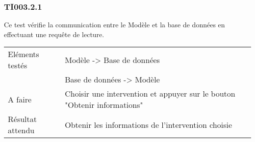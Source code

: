 \subsubsection{TI003.2.1}
  		Ce test vérifie la communication entre le Modèle et la base de données en effectuant une requête de lecture.
  		\begin{center}
    	 		\begin{tabular}[h]{|p{}|p{}|}
			\hline
				Eléments testés & Modèle -> Base de données  \\
							    &  Base de données -> Modèle \\\hline
    				A faire & Choisir une intervention et appuyer sur le bouton "Obtenir informations" \\\hline
    				Résultat attendu & Obtenir les informations de l'intervention choisie \\\hline
     		\end{tabular}
  		\end{center}	